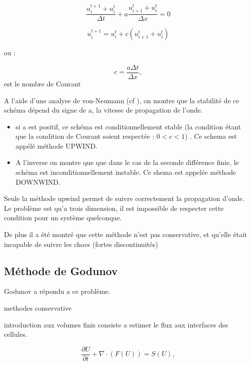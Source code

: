 \begin{equation}
\frac{u_i^{t+1} + u_i^t }{\Delta t}   +a \frac{u_{i+1}^t  + u_i^t}{\Delta x} = 0
\end{equation}

\begin{equation}
u_i^{t+1}  = u_i^t +  c \left( u_{i+1}^t  + u_i^t \right) 
\end{equation}

ou : 

\begin{equation}
c= \frac{a \Delta t}{\Delta x},
\end{equation}
est le nombre de Courant

A l'aide d'une analyse de von-Neumann (cf \cite{toro1999riemann}), on montre que la stabilité de ce schéma dépend du signe de a, la vitesse de propagation de l'onde.

\begin{itemize}
\item si a est positif, ce schéma est conditionnellement stable (la condition étant que la condition de Courant soient respectée : $0<c<1$) .
Ce schema est appélé méthode UPWIND.

\item A l'inverse on montre que que dans le cas de la seconde différence finie, le schéma est inconditionnellement instable. 
Ce shema est appelée méthode DOWNWIND.
\end{itemize}

Seule la méthode upwind permet de suivre correctement la propagation d'onde.
Le problème est qu'a trois dimension, il est impossible de respecter cette condition pour un système quelconque.

De plus il a été montré que cette méthode n'est pas conservative, et qu'elle était incapable de suivre les chocs (fortes discontinuités)

\subsection{Méthode de Godunov}

Godunov  \cite{MR0119433} a répondu a ce problème.

methodes conservative

introduction aux volumes finis
consiste a estimer le flux aux interfaces des cellules.


\begin{equation}
 \frac{\partial U}{\partial t} + \nabla \cdot (F(U)) = S(U), 
\label{eq:rad_generale}
\end{equation}

